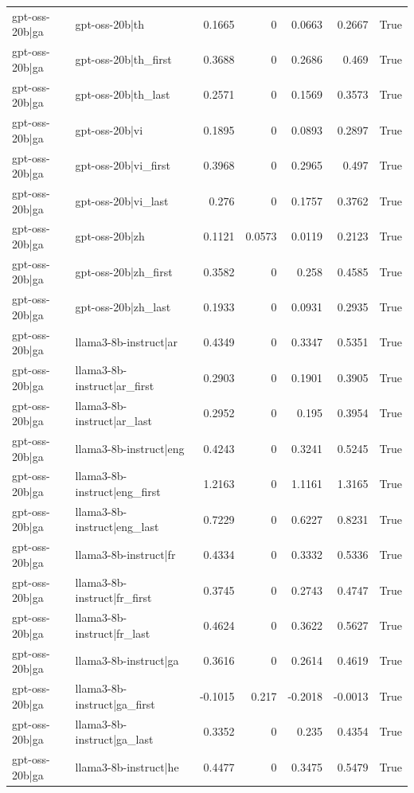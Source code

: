 \begin{table}
\begin{tabular}{l l r r r r l}
gpt-oss-20b|ga & gpt-oss-20b|th & 0.1665 & 0 & 0.0663 & 0.2667 & True \\
gpt-oss-20b|ga & gpt-oss-20b|th_first & 0.3688 & 0 & 0.2686 & 0.469 & True \\
gpt-oss-20b|ga & gpt-oss-20b|th_last & 0.2571 & 0 & 0.1569 & 0.3573 & True \\
gpt-oss-20b|ga & gpt-oss-20b|vi & 0.1895 & 0 & 0.0893 & 0.2897 & True \\
gpt-oss-20b|ga & gpt-oss-20b|vi_first & 0.3968 & 0 & 0.2965 & 0.497 & True \\
gpt-oss-20b|ga & gpt-oss-20b|vi_last & 0.276 & 0 & 0.1757 & 0.3762 & True \\
gpt-oss-20b|ga & gpt-oss-20b|zh & 0.1121 & 0.0573 & 0.0119 & 0.2123 & True \\
gpt-oss-20b|ga & gpt-oss-20b|zh_first & 0.3582 & 0 & 0.258 & 0.4585 & True \\
gpt-oss-20b|ga & gpt-oss-20b|zh_last & 0.1933 & 0 & 0.0931 & 0.2935 & True \\
gpt-oss-20b|ga & llama3-8b-instruct|ar & 0.4349 & 0 & 0.3347 & 0.5351 & True \\
gpt-oss-20b|ga & llama3-8b-instruct|ar_first & 0.2903 & 0 & 0.1901 & 0.3905 & True \\
gpt-oss-20b|ga & llama3-8b-instruct|ar_last & 0.2952 & 0 & 0.195 & 0.3954 & True \\
gpt-oss-20b|ga & llama3-8b-instruct|eng & 0.4243 & 0 & 0.3241 & 0.5245 & True \\
gpt-oss-20b|ga & llama3-8b-instruct|eng_first & 1.2163 & 0 & 1.1161 & 1.3165 & True \\
gpt-oss-20b|ga & llama3-8b-instruct|eng_last & 0.7229 & 0 & 0.6227 & 0.8231 & True \\
gpt-oss-20b|ga & llama3-8b-instruct|fr & 0.4334 & 0 & 0.3332 & 0.5336 & True \\
gpt-oss-20b|ga & llama3-8b-instruct|fr_first & 0.3745 & 0 & 0.2743 & 0.4747 & True \\
gpt-oss-20b|ga & llama3-8b-instruct|fr_last & 0.4624 & 0 & 0.3622 & 0.5627 & True \\
gpt-oss-20b|ga & llama3-8b-instruct|ga & 0.3616 & 0 & 0.2614 & 0.4619 & True \\
gpt-oss-20b|ga & llama3-8b-instruct|ga_first & -0.1015 & 0.217 & -0.2018 & -0.0013 & True \\
gpt-oss-20b|ga & llama3-8b-instruct|ga_last & 0.3352 & 0 & 0.235 & 0.4354 & True \\
gpt-oss-20b|ga & llama3-8b-instruct|he & 0.4477 & 0 & 0.3475 & 0.5479 & True \\

\end{tabular}
\end{table}

